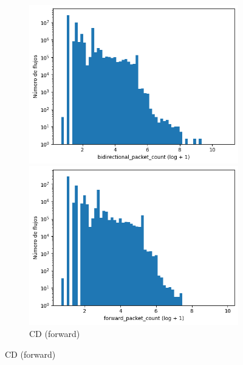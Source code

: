 \begin{figure}[H]
    \centering
    \hfill
    \begin{subfigure}[b]{0.26\textwidth}
        \centering
        \includegraphics[width=\textwidth]{media/packet_pincer_cicddos/bidirectional_packet_count_log_x_log_y.png}
        \caption{CD (bidir.)}
        \includegraphics[width=\textwidth]{media/packet_pincer_cicddos/forward_packet_count_log_x_log_y.png}
        \caption{CD (forward)}

\end{subfigure}
\end{figure}
